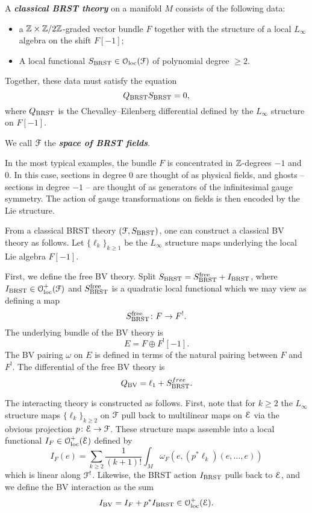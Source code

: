 \documentclass[10pt, oneside]{article}
\newcommand{\defterm}[1]{\textbf{\emph{#1}}}
\begin{document}
\begin{definition}
A \defterm{classical BRST theory} on a manifold $M$ consists of the following data:
\begin{itemize}
\item a $\mathbb Z\times\mathbb Z/2\mathbb Z$-graded vector bundle $F$ together with the structure of a local $L_\infty$ algebra on the shift $F[-1]$;
\item A local functional $S_{\mathrm{BRST}} \in \mathcal{O}_{\rm loc}(\mathcal F)$ of polynomial degree $\geq 2$.
\end{itemize}
Together, these data must satisfy the equation
\[Q_{\mathrm{BRST}} S_{\mathrm{BRST}} = 0,\]
where $Q_{\mathrm{BRST}}$ is the Chevalley--Eilenberg differential defined by the $L_\infty$ structure on $F[-1]$. 
\end{definition}

We call $\mathcal F$ the \defterm{space of BRST fields}.

\begin{remark}
In the most typical examples, the bundle $F$ is concentrated in $\mathbb Z$-degrees $-1$ and 0.  In this case, sections in degree 0 are thought of as physical fields, and ghosts -- sections in degree $-1$ -- are thought of as generators of the infinitesimal gauge symmetry.  The action of gauge transformations on fields is then encoded by the Lie structure.
\end{remark}

From a classical BRST theory $(\mathcal F, S_{\mathrm{BRST}})$, one can construct a classical BV theory as follows. Let $\{\ell_k\}_{k\geq 1}$ be the $L_\infty$ structure maps underlying the local Lie algebra $F[-1]$.

First, we define the free BV theory. Split $S_{\mathrm{BRST}} = S^{\mathrm{free}}_{\mathrm{BRST}} + I_{\mathrm{BRST}}$, where $I_{\mathrm{BRST}}\in\mathcal{O}_{\rm loc}^+(\mathcal F)$ and $S^{\mathrm{free}}_{\mathrm{BRST}}$ is a quadratic local functional which we may view as defining a map
\[S^{\mathrm{free}}_{\mathrm{BRST}}\colon F\rightarrow F^!.\]
The underlying bundle of the BV theory is
\[
E = F \oplus F^! [-1].
\]
The BV pairing $\omega$ on $E$ is defined in terms of the natural pairing between $F$ and $F^!$.
The differential of the free BV theory is
\[Q_{\mathrm{BV}} = \ell_1 + S^{free}_{\mathrm{BRST}}.
\]


The interacting theory is constructed as follows. First, note that for $k \geq 2$ the $L_\infty$ structure maps $\{\ell_k\}_{k \geq 2}$ on $\mathcal F$ pull back to multilinear maps on $\mathcal E$ via the obvious projection $p\colon \mathcal E\rightarrow \mathcal F$. These structure maps assemble into a local functional $I_F \in \mathcal{O}_{\rm loc}^+(\mathcal E)$ defined by
\[
I_F (e) = \sum_{k \geq 2} \frac{1}{(k+1)!} \int_M \omega_F(e, (p^*\ell_k) (e, \ldots, e))
\] 
which is linear along $\mathcal F^!$. Likewise, the BRST action $I_{\mathrm{BRST}}$ pulls back to $\mathcal E$, and we define the BV interaction as the sum
\[
I_{\mathrm{BV}} = I_{F} + p^* I_{\mathrm{BRST}} \in \mathcal{O}_{\rm loc}^+(\mathcal E) .
\]
\end{document}
